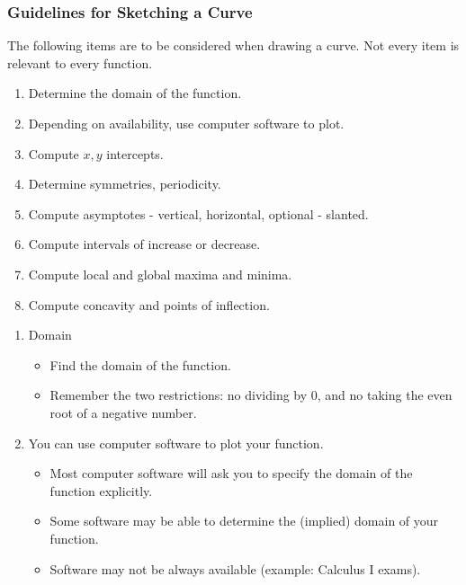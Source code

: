 \begin{frame}
\frametitle{Guidelines for Sketching a Curve}
The following items are to be considered when drawing a curve. \alert<2>{Not every item is relevant to every function.}
\begin{enumerate}
\item  Determine the domain of the function.
\item  Depending on availability, use computer software to plot. 
\item  \alert<2>{Compute $x,y$ intercepts.}
\item  \alert<2>{Determine symmetries, periodicity.}
\item  \alert<2>{Compute asymptotes - vertical, horizontal, {\color{gray} optional - slanted}.}
\item  Compute intervals of increase or decrease.
\item  Compute local and global maxima and minima.
\item  Compute concavity and points of inflection.
\end{enumerate}
\end{frame}

\begin{frame}[t]
\begin{enumerate}
\item  \alert<3>{Domain}
\begin{itemize}
\item  Find the domain of the function.  
\item  Remember the two restrictions: no dividing by $0$, and no taking the even root of a negative number.
\end{itemize}
\item<2-> You can use computer software to plot your function.
\begin{itemize}
\item<3-> Most computer software will ask you to specify the \alert<3>{domain of the function} explicitly.
\item<4-> Some software may be able to determine the (implied) domain of your function.
\item<5-> Software may not be always available (example: Calculus I exams).
\end{itemize} 
\end{enumerate}
\end{frame}


